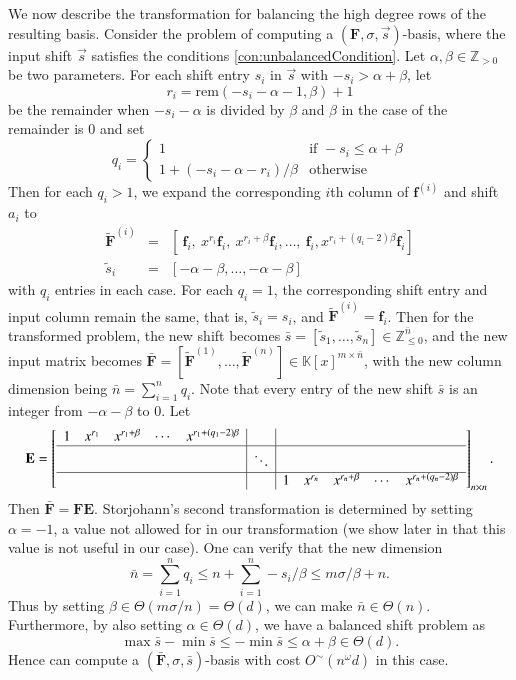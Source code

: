 We now describe the transformation for balancing the high degree rows
of the resulting basis. Consider the problem of computing a $\left(\mathbf{F},\sigma,\vec{s}\right)$-basis,
where the input shift $\vec{s}$ satisfies the conditions \eqref{con:unbalancedCondition}.
Let $\alpha,\beta\in\mathbb{Z}_{>0}$ be two parameters. For each
shift entry $s_{i}$ in $\vec{s}$ with $-s_{i}>\alpha+\beta$, let
\[
r_{i}=\mbox{rem}\left(-s_{i}-\alpha-1,\beta\right)+1\]
 be the remainder when $-s_{i}-\alpha$ is divided by $\beta$ and
$\beta$ in the case of the remainder is $0$ and set \[
q_{i}=\begin{cases}
1 & \mbox{if }-s_{i}\le\alpha+\beta\\
1+\left(-s_{i}-\alpha-r_{i}\right)/\beta & \mbox{otherwise}\end{cases}\]
 Then for each $q_{i}>1$, we expand the corresponding $i$th column
of $\mathbf{f}^{\left(i\right)}$ and shift $a_{i}$ to \begin{eqnarray*}
\tilde{\mathbf{F}}^{\left(i\right)} & = & \left[~\mathbf{f}_{i},~x^{r_{i}}\mathbf{f}_{i},~x^{r_{i}+\beta}\mathbf{f}_{i},\dots,~\mathbf{f}_{i},x^{r_{i}+(q_{i}-2)\beta}\mathbf{f}_{i}\right]\\
\tilde{s}_{i} & = & \left[-\alpha-\beta,\dots,-\alpha-\beta\right]\end{eqnarray*}
 with $q_{i}$ entries in each case. For each $q_{i}=1$, the corresponding
shift entry and input column remain the same, that is, $\tilde{s}_{i}=s_{i}$,
and $\tilde{\mathbf{F}}^{\left(i\right)}=\mathbf{f}_{i}$. Then for
the transformed problem, the new shift becomes $\bar{s}=[\tilde{s}_{1},\dots,\tilde{s}_{n}]\in\mathbb{Z}_{\le0}^{\bar{n}}$,
and the new input matrix becomes $\bar{\mathbf{F}}=[\tilde{\mathbf{F}}^{\left(1\right)},\dots,\tilde{\mathbf{F}}^{\left(n\right)}]\in\mathbb{K}\left[x\right]^{m\times\bar{n}}$,
with the new column dimension being $\bar{n}=\sum_{i=1}^{n}q_{i}$.
Note that every entry of the new shift $\bar{s}$ is an integer from
$-\alpha-\beta$ to $0$. Let \[
\mathbf{E}=\left[\begin{array}{ccccc|c|ccccccc}
1 & x^{r_{1}} & x^{r_{1}+\beta} & \cdots & x^{r_{1}+(q_{1}-2)\beta} & \\
\hline  &  &  &  &  & \ddots\\
\hline  &  &  &  &  &  & 1 & x^{r_{n}} & x^{r_{n}+\beta} & \cdots & x^{r_{n}+(q_{n}-2)\beta}\end{array}\right]_{n\times\bar{n}}.\]
 Then $\bar{\mathbf{F}}=\mathbf{F}\mathbf{E}$. Storjohann's second
transformation is determined by setting $\alpha=-1$, a value not
allowed for in our transformation (we show later in 
that this value is not useful in our case). One can verify that the
new dimension \[
\bar{n}=\sum_{i=1}^{n}q_{i}\le n+\sum_{i=1}^{n}-s_{i}/\beta\le m\sigma/\beta+n.\]
 Thus by setting $\beta\in\Theta\left(m\sigma/n\right)=\Theta\left(d\right)$,
we can make $\bar{n}\in\Theta\left(n\right)$. Furthermore, by also
setting $\alpha\in\Theta\left(d\right)$, we have a balanced shift
problem as \[
\max\bar{s}-\min\bar{s}\le-\min\bar{s}\le\alpha+\beta\in\Theta(d).\]
 Hence  can compute a $\left(\bar{\mathbf{F}},\sigma,\bar{s}\right)$-basis
with cost $O^{\sim}\left(n^{\omega}d\right)$ in this case.

